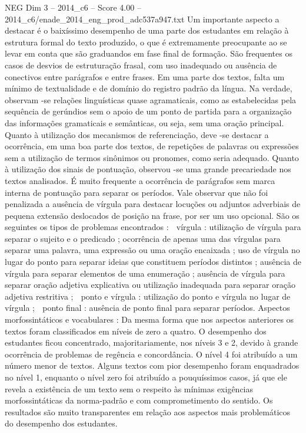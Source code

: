 \begin{textsample}{NEG Dim 3 – 2014\_c6 – Score 4.00 – 2014\_c6/enade\_2014\_eng\_prod\_adc537a947.txt}
Um importante aspecto a destacar é o baixíssimo desempenho de uma parte dos estudantes em relação à estrutura formal do texto produzido, o que é extremamente preocupante ao se levar em conta que são graduandos em fase final de formação.
São frequentes os casos de desvios de estruturação frasal, com uso inadequado ou ausência de conectivos entre parágrafos e entre frases.
Em uma parte dos textos, falta um mínimo de textualidade e de domínio do registro padrão da língua.
Na verdade, observam -se relações linguísticas quase agramaticais, como as estabelecidas pela sequência de gerúndios sem o apoio de um ponto de partida para a organização das informações gramaticais e semânticas, ou seja, sem uma oração principal.
Quanto à utilização dos mecanismos de referenciação, deve -se destacar a ocorrência, em uma boa parte dos textos, de repetições de palavras ou expressões sem a utilização de termos sinônimos ou pronomes, como seria adequado.
Quanto à utilização dos sinais de pontuação, observou -se uma grande precariedade nos textos analisados.
É muito frequente a ocorrência de parágrafos sem marca interna de pontuação para separar os períodos.
Vale observar que não foi penalizada a ausência de vírgula para destacar locuções ou adjuntos adverbiais de pequena extensão deslocados de posição na frase, por ser um uso opcional.
São os seguintes os tipos de problemas encontrados :  vírgula : utilização de vírgula para separar o sujeito e o predicado ; ocorrência de apenas uma das vírgulas para separar uma palavra, uma expressão ou uma oração encaixada ; uso de vírgula no lugar do ponto para separar ideias que constituem períodos distintos ; ausência de vírgula para separar elementos de uma enumeração ; ausência de vírgula para separar oração adjetiva explicativa ou utilização inadequada para separar oração adjetiva restritiva ;  ponto e vírgula : utilização do ponto e vírgula no lugar de vírgula ;  ponto final : ausência de ponto final para separar períodos.
Aspectos morfossintáticos e vocabulares : Da mesma forma que nos aspectos anteriores os textos foram classificados em níveis de zero a quatro.
O desempenho dos estudantes ficou concentrado, majoritariamente, nos níveis 3 e 2, devido à grande ocorrência de problemas de regência e concordância.
O nível 4 foi atribuído a um número menor de textos.
Alguns textos com pior desempenho foram enquadrados no nível 1, enquanto o nível zero foi atribuído a pouquíssimos casos, já que ele revela a existência de um texto sem o respeito às mínimas exigências morfossintáticas da norma-padrão e com comprometimento do sentido.
Os resultados são muito transparentes em relação aos aspectos mais problemáticos do desempenho dos estudantes.

\end{textsample}
